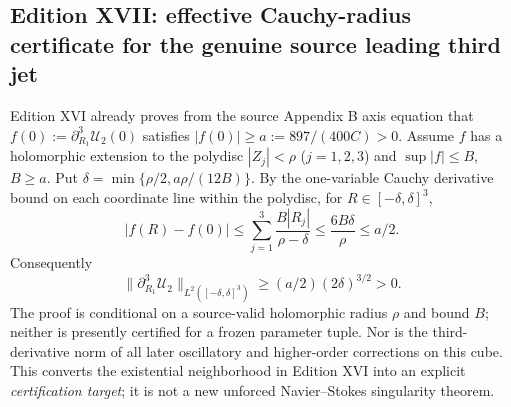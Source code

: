 \subsection*{Edition XVII: effective Cauchy-radius certificate for the genuine source leading third jet}
\label{subsec:XVII-cauchy}
Edition XVI already proves from the source Appendix B axis equation that
$f(0):=\partial_{R_1}^3\mathcal U_2(0)$ satisfies
$|f(0)|\ge a:=897/(400C)>0$.
Assume $f$ has a holomorphic extension to the polydisc
$|Z_j|<\rho$ ($j=1,2,3$) and
$\sup|f|\le B$, $B\ge a$.
Put $\delta=\min\{\rho/2,a\rho/(12B)\}$.
By the one-variable Cauchy derivative bound on each coordinate line
within the polydisc, for $R\in[-\delta,\delta]^3$,
\[
|f(R)-f(0)|\le\sum_{j=1}^3\frac{B|R_j|}{\rho-\delta}
\le\frac{6B\delta}{\rho}\le a/2.
\]
Consequently
\[
\boxed{\|\partial_{R_1}^3\mathcal U_2\|_{L^2([-\delta,\delta]^3)}
\ge (a/2)(2\delta)^{3/2}>0.}
\]
The proof is conditional on a source-valid holomorphic radius
$\rho$ and bound $B$; neither is presently certified for a
frozen parameter tuple. Nor is the third-derivative norm of
all later oscillatory and higher-order corrections on this cube.
This converts the existential neighborhood in Edition XVI into
an explicit \emph{certification target}; it is not a new
unforced Navier--Stokes singularity theorem.